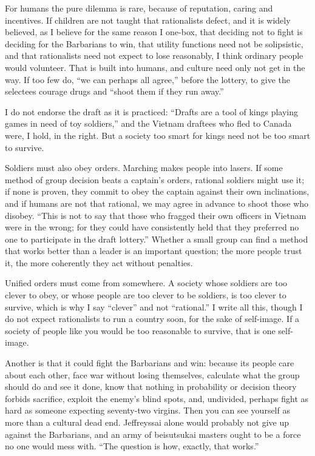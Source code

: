 For humans the pure dilemma is rare, because of reputation, caring and incentives. If children are not taught that rationalists defect, and it is widely believed, as I believe for the same reason I one-box, that deciding not to fight is deciding for the Barbarians to win, that utility functions need not be solipsistic, and that rationalists need not expect to lose reasonably, I think ordinary people would volunteer. That is built into humans, and culture need only not get in the way. If too few do, ``we can perhaps all agree,'' before the lottery, to give the selectees courage drugs and ``shoot them if they run away.'' 

I do not endorse the draft as it is practiced: ``Drafts are a tool of kings playing games in need of toy soldiers,'' and the Vietnam draftees who fled to Canada were, I hold, in the right. But a society too smart for kings need not be too smart to survive. 

Soldiers must also obey orders. Marching makes people into lasers. If some method of group decision beats a captain's orders, rational soldiers might use it; if none is proven, they commit to obey the captain against their own inclinations, and if humans are not that rational, we may agree in advance to shoot those who disobey. ``This is not to say that those who fragged their own officers in Vietnam were in the wrong; for they could have consistently held that they preferred no one to participate in the draft lottery.'' Whether a small group can find a method that works better than a leader is an important question; the more people trust it, the more coherently they act without penalties.

Unified orders must come from somewhere. A society whose soldiers are too clever to obey, or whose people are too clever to be soldiers, is too clever to survive, which is why I say ``clever'' and not ``rational.'' I write all this, though I do not expect rationalists to run a country soon, for the sake of self-image. If a society of people like you would be too reasonable to survive, that is one self-image.

Another is that it could fight the Barbarians and win: because its people care about each other, face war without losing themselves, calculate what the group should do and see it done, know that nothing in probability or decision theory forbids sacrifice, exploit the enemy's blind spots, and, undivided, perhaps fight as hard as someone expecting seventy-two virgins. Then you can see yourself as more than a cultural dead end. Jeffreyssai alone would probably not give up against the Barbarians, and an army of beisutsukai masters ought to be a force no one would mess with. ``The question is how, exactly, that works.''
